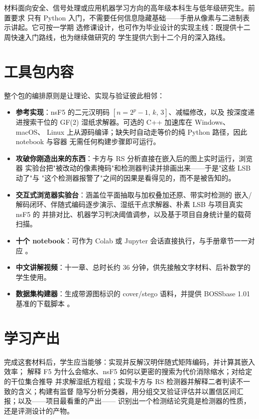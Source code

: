 \documentclass[11pt,a4paper,fontset=windows]{ctexart}
\begin{document}
材料面向安全、信号处理或应用机器学习方向的高年级本科生与低年级研究生。前置要求
只有 Python 入门，不需要任何信息隐藏基础——手册从像素与二进制表示讲起。它可按一学期
选修课设计，也可作为毕业设计的实现主线：既提供十二周快速入门路线，也为继续做研究的
学生提供六到十二个月的深入路线。

\section*{工具包内容}

整个包的编排原则是让理论、实现与验证彼此相邻：

\begin{itemize}
\item \textbf{参考实现}：nsF5 的二元汉明码 $[n = 2^p - 1,\, k,\, 3]$、减幅修改，以及
  按深度递进搜索干位的 GF(2) 湿纸求解器。可选的 C++ 加速库在 Windows、macOS、
  Linux 上从源码编译；缺失时自动走等价的纯 Python 路径，因此 notebook 与容器
  无需任何构建步骤即可运行。
\item \textbf{攻破你刚造出来的东西}：卡方与 RS 分析直接在嵌入后的图上实时运行，浏览器
  实验台把"被改动的像素掩码"和检测器判读并排画出来——于是"这些 LSB 动了"与
  "这个检测器报警了"之间的因果是看得见的，而不是被告知的。
\item \textbf{交互式浏览器实验台}：涵盖位平面抽取与加权叠加还原、带实时检测的
  嵌入/解码闭环、伴随式编码逐步演示、湿纸干点求解器、朴素 LSB 与项目真实 nsF5 的
  并排对比、机器学习判决阈值调参，以及基于项目自身统计量的载荷扫描。
\item \textbf{十个 notebook}：可作为 Colab 或 Jupyter 会话直接执行，与手册章节一一对应
  \citep{perez2007ipython}。
\item \textbf{中文讲解视频}：十一章、总时长约 36 分钟，供先接触文字材料、后补数学的
  学生使用。
\item \textbf{数据集构建器}：生成带源图标识的 cover/stego 语料，并提供 BOSSbase 1.01
  基准的下载脚本 \citep{bas2011boss}。
\end{itemize}

\section*{学习产出}

完成这套材料后，学生应当能够：实现并反解汉明伴随式矩阵编码，并计算其嵌入效率；
解释 F5 为什么会缩水、nsF5 如何以更密的搜索为代价消除缩水；对给定的干位集合推导
并求解湿纸方程组；实现卡方与 RS 检测器并解释二者判读不一致的含义；构建有监督
隐写分析分类器，用分组交叉验证评估并以置信区间汇报；以及——项目最看重的产出——
识别出一个检测结论究竟是检测器的性质，还是评测设计的产物。
\end{document}

